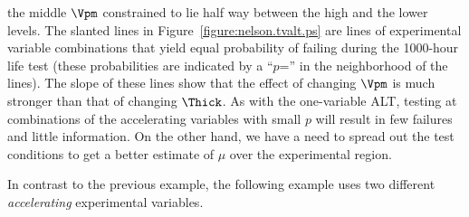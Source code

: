 \begin{example}
the middle $\Vpm$ constrained to lie half way between the high and
the lower levels.  The slanted lines in
Figure~\ref{figure:nelson.tvalt.ps} are lines of experimental
variable combinations that yield equal probability of failing during
the 1000-hour life test (these probabilities are indicated by a
``$p$='' in the neighborhood of the lines).  The slope of these
lines show that the effect of changing $\Vpm$ is much stronger than
that of changing $\Thick$.  As with the one-variable ALT, testing at
combinations of the accelerating variables with small $p$ will
result in few failures and little information. On the other hand, we
have a need to spread out the test conditions to get a better
estimate of $\mu$ over the experimental region.
\end{example}

In contrast to the previous
example, the following example uses two different {\em accelerating}
experimental variables.

